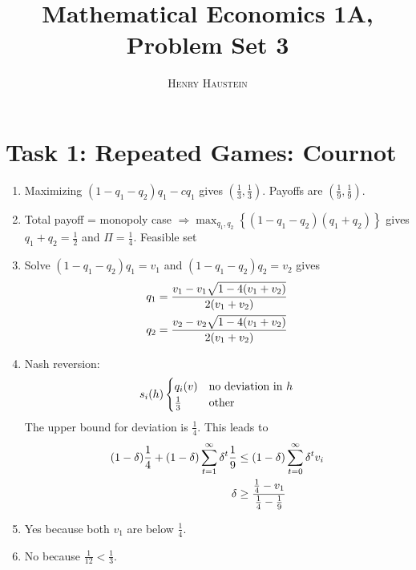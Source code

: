 \documentclass{article}
\title{\textbf{Mathematical Economics 1A, Problem Set 3}}
\author{\textsc{Henry Haustein}}
\date{}
\begin{document}
	\maketitle
	
	\section*{Task 1: Repeated Games: Cournot}
	\begin{enumerate}[label=(\alph*)]
		\item Maximizing $(1-q_1-q_2)q_1 - cq_1$ gives $\left(\frac{1}{3},\frac{1}{3}\right)$. Payoffs are $\left(\frac{1}{9},\frac{1}{9}\right)$.
		\item Total payoff = monopoly case $\Rightarrow \max_{q_1,q_2}\left\lbrace(1-q_1-q_2)(q_1+q_2)\right\rbrace$ gives $q_1+q_2=\frac{1}{2}$ and $\Pi = \frac{1}{4}$. Feasible set
		\begin{center}
		\end{center}
		\item Solve $(1-q_1-q_2)q_1 = v_1$ and $(1-q_1-q_2)q_2 = v_2$ gives
		\begin{align}
			q_1 &= \frac{v_1 - v_1\sqrt{1-4(v_1+v_2)}}{2(v_1+v_2)} \notag \\
			q_2 &= \frac{v_2 - v_2\sqrt{1-4(v_1+v_2)}}{2(v_1+v_2)} \notag
		\end{align}
		\item Nash reversion:
		\begin{align}
			s_i(h) \begin{cases}
				q_i(v) &\text{no deviation in }h \\
				\frac{1}{3} &\text{other}
			\end{cases} \notag
		\end{align}
		The upper bound for deviation is $\frac{1}{4}$. This leads to
		\begin{align}
			(1-\delta)\frac{1}{4} + (1-\delta)\sum_{t=1}^{\infty}\delta^t\frac{1}{9} &\le (1-\delta)\sum_{t=0}^\infty \delta^t v_i \notag \notag \\
			\delta &\ge \frac{\frac{1}{4}-v_1}{\frac{1}{4}-\frac{1}{9}} \notag
		\end{align}
		\item Yes because both $v_1$ are below $\frac{1}{4}$.
		\item No because $\frac{1}{12} < \frac{1}{3}$.
	\end{enumerate}
\end{document}
